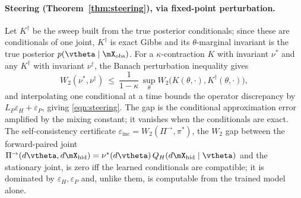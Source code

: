 \paragraph{Steering (Theorem~\ref{thm:steering}), via fixed-point perturbation.}
Let $K^\dagger$ be the sweep built from the true posterior conditionals; since these are conditionals
of one joint, $K^\dagger$ is exact Gibbs and its $\theta$-marginal invariant is the true posterior
$p(\vtheta\mid\xobs)$. For a $\kappa$-contraction $K$ with invariant $\nu^\ast$ and any $K^\dagger$
with invariant $\nu^\dagger$, the Banach perturbation inequality gives
\[
    W_2(\nu^\ast,\nu^\dagger)\ \le\ \frac{1}{1-\kappa}\,\sup_\theta W_2\big(K(\theta,\cdot),K^\dagger(\theta,\cdot)\big),
\]
and interpolating one conditional at a time bounds the operator discrepancy by
$L_P\varepsilon_H + \varepsilon_P$, giving \eqref{eqn:steering}. The gap is the conditional
approximation error amplified by the mixing constant; it vanishes when the conditionals are exact.
The self-consistency certificate $\varepsilon_{\mathrm{inc}} = W_2(\Pi^\rightarrow,\pi^\ast)$, the
$W_2$ gap between the forward-paired joint $\Pi^\rightarrow(d\vtheta,d\mX_{\mathrm{hid}}) =
\nu^\ast(d\vtheta)\,Q_H(d\mX_{\mathrm{hid}}\mid\vtheta)$ and the stationary joint, is zero iff the
learned conditionals are compatible; it is dominated by $\varepsilon_H,\varepsilon_P$ and, unlike
them, is computable from the trained model alone.
